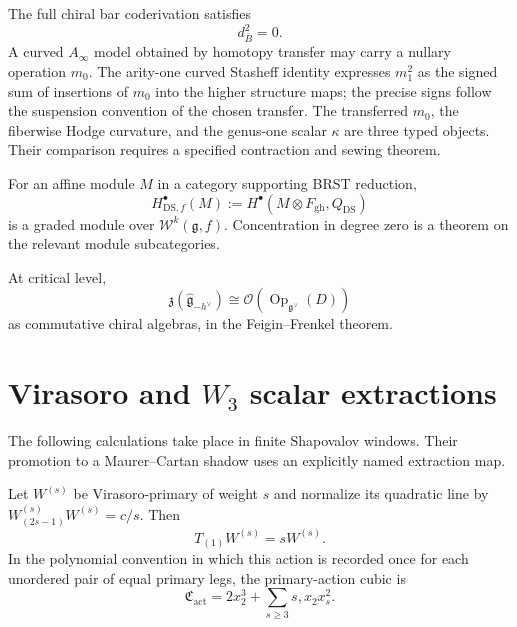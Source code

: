 \begin{theorem}
\label{thm:w-bar-curvature}
The full chiral bar coderivation satisfies
\begin{equation}\label{eq:bar-square-zero-repaired}
d_{\bar B}^{2}=0.
\end{equation}
A curved $A_\infty$ model obtained by homotopy transfer may carry a
nullary operation $m_0$.  The arity-one curved Stasheff identity
expresses $m_1^2$ as the signed sum of insertions of $m_0$ into the
higher structure maps; the precise signs follow the suspension
convention of the chosen transfer.
The transferred $m_0$, the fiberwise Hodge curvature, and the
genus-one scalar $\kappa$ are three typed objects.  Their comparison
requires a specified contraction and sewing theorem.
\end{theorem}

\begin{definition}
\label{def:w-module-ds}
For an affine module $M$ in a category supporting BRST reduction,
\[
H^\bullet_{\mathrm{DS},f}(M)
:=H^\bullet(M\otimes F_{\mathrm{gh}},Q_{\mathrm{DS}})
\]
is a graded module over $\mathcal W^k(\mathfrak g,f)$.  Concentration
in degree zero is a theorem on the relevant module subcategories.
\end{definition}

\begin{theorem}
\label{thm:feigin-frenkel-center}
At critical level,
\[
\mathfrak z(\widehat{\mathfrak g}_{-h^\vee})
\cong\mathcal O(\operatorname{Op}_{\mathfrak g^\vee}(D))
\]
as commutative chiral algebras, in the Feigin--Frenkel theorem.
\end{theorem}

\section{Virasoro and $W_3$ scalar extractions}
\label{sec:mixed-cubic-quartic-shadows}

The following calculations take place in finite Shapovalov windows.
Their promotion to a Maurer--Cartan shadow uses an explicitly named
extraction map.

\begin{theorem}
\label{thm:w-universal-gravitational-cubic}
Let $W^{(s)}$ be Virasoro-primary of weight $s$ and normalize its
quadratic line by $W^{(s)}_{(2s-1)}W^{(s)}=c/s$.  Then
\[
T_{(1)}W^{(s)}=sW^{(s)}.
\]
In the polynomial convention in which this action is recorded once
for each unordered pair of equal primary legs, the primary-action
cubic is
\begin{equation}\label{eq:primary-action-cubic-repaired}
\mathfrak C_{\mathrm{act}}
=2x_2^3+\sum_{s\ge3}s,x_2x_s^2.
\end{equation}
\end{theorem}

